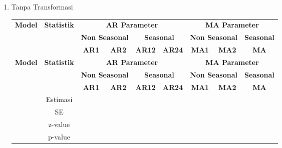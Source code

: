 \begin{enumerate}[label=\alph*.]
    \item Tanpa Transformasi
        \tiny
        \begin{longtable}{|c|c|c|c|c|c|c|c|c|}
            \hline
            \multirow{3}{*}{\centering\textbf{Model}} &
            \multirow{3}{*}{\centering\textbf{Statistik}} &
            \multicolumn{4}{c|}{\textbf{AR Parameter}} &
            \multicolumn{3}{c|}{\textbf{MA Parameter}} \\ \cline{3-9}

            & &
            \multicolumn{2}{c|}{\textbf{Non Seasonal}} &
            \multicolumn{2}{c|}{\textbf{Seasonal}} &
            \multicolumn{2}{c|}{\textbf{Non Seasonal}} &
            \textbf{Seasonal} \\ \cline{3-9}

            & &
            \textbf{AR1} & \textbf{AR2} &
            \textbf{AR12} & \textbf{AR24} &
            \textbf{MA1} & \textbf{MA2} &
            \textbf{MA} \\ \hline
            \endfirsthead

            \hline
            \multirow{3}{*}{\centering\textbf{Model}} &
            \multirow{3}{*}{\centering\textbf{Statistik}} &
            \multicolumn{4}{c|}{\textbf{AR Parameter}} &
            \multicolumn{3}{c|}{\textbf{MA Parameter}} \\ \cline{3-9}

            & &
            \multicolumn{2}{c|}{\textbf{Non Seasonal}} &
            \multicolumn{2}{c|}{\textbf{Seasonal}} &
            \multicolumn{2}{c|}{\textbf{Non Seasonal}} &
            \textbf{Seasonal} \\ \cline{3-9}

            & &
            \textbf{AR1} & \textbf{AR2} &
            \textbf{AR12} & \textbf{AR24} &
            \textbf{MA1} & \textbf{MA2} &
            \textbf{MA} \\ \hline
            \endhead

            \hline
            \endfoot

            \hline
            \endlastfoot


            \hline
            \multirow{4}{*}{$(0,0,0)\times(0,1,0)_{12}$}
            & Estimasi & {} & {} & {} & {} & {} & {} & {} \\ \cline{2-9}
            & SE       & {} & {} & {} & {} & {} & {} & {}\\ \cline{2-9}
            & z-value  &  {}   & {} & {} & {} & {} & {} & {} \\ \cline{2-9}
            & p-value  & {} & {} & {} & {} & {} & {} & {} \\ \hline


\end{longtable}
\end{enumerate}
